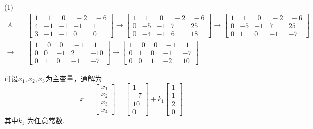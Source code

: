 \documentclass[a4paper]{book}
\begin{document}
(1)
\begin{displaymath}
\begin{aligned}
A=&\begin{bmatrix} 1&\ \ 1&\ \ 0&\ -2&\ -6\\4&-1&-1&-1&1\\3&-1&-1&0&0 \end{bmatrix}\rightarrow
\begin{bmatrix} 1&\ \ 1&\ \ 0&\ -2&\ -6\\0&-5&-1&7&25\\0&-4&-1&6&18 \end{bmatrix}\rightarrow
\begin{bmatrix} 1&\ \ 1&\ \ 0&\ -2&\ -6\\0&-5&-1&7&25\\0&1&0&-1&-7 \end{bmatrix}\\ \rightarrow &
\begin{bmatrix}1&\ \ 0&\ \ 0&\ -1&\ \ 1\\0&0&-1&2&-10\\0&1&0&-1&-7  \end{bmatrix} \rightarrow
\begin{bmatrix}1&\ \ 0&\ \ 0&\ -1& \ \ 1\\0&1&0&-1&-7\\0&0&1&-2&10  \end{bmatrix}
\end{aligned} \end{displaymath}

可设$x_1,x_2,x_3$为主变量，通解为
\begin{displaymath}
x=\begin{bmatrix}x_1\\x_2\\x_3\\x_4\end{bmatrix}=\begin{bmatrix}1\\-7\\10\\0\end{bmatrix}
+k_1\begin{bmatrix}1\\1\\2\\0\end{bmatrix}
\end{displaymath}
其中$k_1$ 为任意常数.
\end{document}
